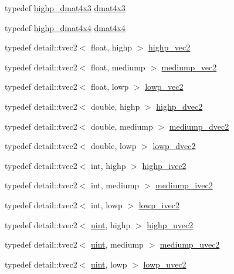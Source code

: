 \begin{CompactItemize}
\item 
typedef \hyperlink{group__core__precision_gf8aeba0eecc5c651e0f06414b6e37754}{highp\_\-dmat4x3} \hyperlink{group__core__types_ga4a157ac183c5bd5dcbd555a94b1b505}{dmat4x3}
\item 
typedef \hyperlink{group__core__precision_g1c0a2edbde597b59e9005691a224b208}{highp\_\-dmat4x4} \hyperlink{group__core__types_g54d90d4b902d93638b906571af215bb1}{dmat4x4}
\item 
typedef detail::tvec2$<$ float, highp $>$ \hyperlink{group__core__precision_g37645abcfcc1278567e99f1ca492bfbb}{highp\_\-vec2}
\item 
typedef detail::tvec2$<$ float, mediump $>$ \hyperlink{group__core__precision_g1365858c541931eb8a7473fa85a1d1cf}{mediump\_\-vec2}
\item 
typedef detail::tvec2$<$ float, lowp $>$ \hyperlink{group__core__precision_gc63d79532b7e8d18f579ebe63e4fde49}{lowp\_\-vec2}
\item 
typedef detail::tvec2$<$ double, highp $>$ \hyperlink{group__core__precision_gcfbe8512142fff27f0bfb44958c1752f}{highp\_\-dvec2}
\item 
typedef detail::tvec2$<$ double, mediump $>$ \hyperlink{group__core__precision_gce1f1cc2eb8e978dcb60e682af87b541}{mediump\_\-dvec2}
\item 
typedef detail::tvec2$<$ double, lowp $>$ \hyperlink{group__core__precision_g27a115a27d5f065e8c043f57191d583b}{lowp\_\-dvec2}
\item 
typedef detail::tvec2$<$ int, highp $>$ \hyperlink{group__core__precision_gb2bac6095f51f7d7f74747afc2f6747a}{highp\_\-ivec2}
\item 
typedef detail::tvec2$<$ int, mediump $>$ \hyperlink{group__core__precision_g4f1bf9844e667805235823afe809aa73}{mediump\_\-ivec2}
\item 
typedef detail::tvec2$<$ int, lowp $>$ \hyperlink{group__core__precision_g562c5c67d6431ab88fc4a032239e2137}{lowp\_\-ivec2}
\item 
typedef detail::tvec2$<$ \hyperlink{group__core__precision_g4fd29415871152bfb5abd588334147c8}{uint}, highp $>$ \hyperlink{group__core__precision_gaf92be4c1fca33cff90c1ed15b521c79}{highp\_\-uvec2}
\item 
typedef detail::tvec2$<$ \hyperlink{group__core__precision_g4fd29415871152bfb5abd588334147c8}{uint}, mediump $>$ \hyperlink{group__core__precision_g15c8fb77bdb6763ef73b39e02eb98a56}{mediump\_\-uvec2}
\item 
typedef detail::tvec2$<$ \hyperlink{group__core__precision_g4fd29415871152bfb5abd588334147c8}{uint}, lowp $>$ \hyperlink{group__core__precision_g06c64bb528bbecf276ab2d4a2b6c934e}{lowp\_\-uvec2}

\end{CompactItemize}
